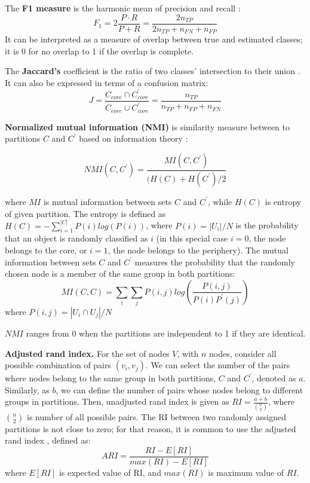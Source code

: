 The \textbf{F1 measure} is the harmonic mean of precision and recall \cite{labatut2012accuracy}:
\begin{equation}
F_1 = 2\frac{P \cdot R}{P+R} = \frac{2n_{TP}}{2n_{TP}+n_{FN} + n_{FP}}
\end{equation}
It can be interpreted as a measure of overlap between true and estimated classes; it is 0 for no overlap to 1 if the overlap is complete.

The \textbf{Jaccard's} coefficient is the ratio of two classes' intersection to their union \cite{labatut2012accuracy}. It can also be expressed in terms of a confusion matrix: 
\begin{equation}
J =  \frac{C_{core} \cap C^{'}_{core}}{C_{core} \cup C^{'}_{core}} =   \frac{n_{TP}}{n_{TP}+n_{FP} + n_{FN}}
\end{equation}

\textbf{Normalized mutual information (NMI)} is similarity measure between to partitions $C$ and $C^{'}$  based on information theory \cite{danon2005comparing}:

\begin{equation}
NMI(C, C^{'}) = \frac{MI(C, C^{'})}{(H(C)+H(C^{'})/2}
\end{equation}

where $MI$ is mutual information between sets $C$ and $C^{'}$, while $H(C)$ is entropy of given partition. The entropy is defined as $H(C) = - \sum_{i=1}^{|C|}P(i)log(P(i))$, where $P(i) = |U_i|/N$ is the probability that an object is randomly classified as $i$ (in this special case $i=0$, the node belongs to the core, or $i=1$, the node belongs to the periphery). The mutual information between sets $C$ and $C^{'}$ measures the probability that the randomly chosen node is a member of the same group in both partitions:
\begin{equation}
MI(C, C) = \sum_i\sum_j P(i, j) log(\frac{P(i,j)}{P(i)P^{'}(j)})    
\end{equation}
where $P(i, j)= |U_i \cap U_j|/N$

$NMI$ ranges from 0 when the partitions are independent to 1 if they are identical.   

\textbf{Adjusted rand index.} For the set of nodes $V$, with $n$ nodes, consider all possible combination of pairs $(v_i, v_j)$. We can select the number of the pairs where nodes belong to the same group in both partitions, $C$ and  $C^{'}$, denoted as $a$. Similarly, as $b$, we can define the number of pairs whose nodes belong to different groups in partitions. Then, unadjusted rand index \cite{santos2009use} is given as $RI = \frac{a+b}{\binom{n}{2}}$, where $\binom{n}{2}$ is number of all possible pairs. The RI between two randomly assigned partitions is not close to zero; for that reason, it is common to use the adjusted rand index \cite{hubert1985comparing}, defined as:
\begin{equation}
ARI = \frac{RI - E[RI]}{max(RI)- E[RI]}
\end{equation}
where $E[RI]$ is expected value of RI, and $max(RI)$ is maximum value of $RI$. 

